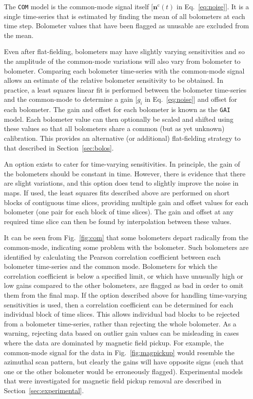 \documentclass[useAMS,usenatbib,nofootinbib]{mn2e}
\newcommand{\model}[1]{\texttt{#1}}
\begin{document}
The \model{COM} model is the common-mode signal itself
[$\mathbf{n}^\mathrm{c}(t)$ in Eq.~\ref{eq:noise}]. It is a single
time-series that is estimated by finding the mean of all bolometers at
each time step. Bolometer values that have been flagged as unusable
are excluded from the mean.

Even after flat-fielding, bolometers may have slightly varying
sensitivities and so the amplitude of the common-mode variations will
also vary from bolometer to bolometer. Comparing each bolometer
time-series with the common-mode signal allows an estimate of the
relative bolometer sensitivity to be obtained. In practice, a least
squares linear fit is performed between the bolometer time-series and
the common-mode to determine a gain [$g_i$ in Eq.~\ref{eq:noise}] and
offset for each bolometer.  The gain and offset for each bolometer is
known as the \model{GAI} model. Each bolometer value can then
optionally be scaled and shifted using these values so that all
bolometers share a common (but as yet unknown) calibration. This
provides an alternative (or additional) flat-fielding strategy to that
described in Section~\ref{sec:bolos}.

An option exists to cater for time-varying sensitivities. In
principle, the gain of the bolometers should be constant in
time. However, there is evidence that there are slight variations, and
this option does tend to slightly improve the noise in maps.  If used,
the least squares fits described above are performed on short blocks
of contiguous time slices, providing multiple gain and offset values
for each bolometer (one pair for each block of time slices). The gain
and offset at any required time slice can then be found by
interpolation between these values.

It can be seen from Fig.~\ref{fig:com} that some bolometers depart
radically from the common-mode, indicating some problem with the
bolometer. Such bolometers are identified by calculating the Pearson
correlation coefficient between each bolometer time-series and the
common mode. Bolometers for which the correlation coefficient is below
a specified limit, or which have unusually high or low gains compared
to the other bolometers, are flagged as bad in order to omit them from
the final map. If the option described above for handling time-varying
sensitivities is used, then a correlation coefficient can be
determined for each individual block of time slices.  This allows
individual bad blocks to be rejected from a bolometer time-series,
rather than rejecting the whole bolometer. As a warning, rejecting
data based on outlier gain values can be misleading in cases where the
data are dominated by magnetic field pickup. For example, the
common-mode signal for the data in Fig.~\ref{fig:magpickup} would
resemble the azimuthal scan pattern, but clearly the gains will have
opposite signs (such that one or the other bolometer would be
erroneously flagged). Experimental models that were investigated for
magnetic field pickup removal are described in
Section~\ref{sec:experimental}.
\end{document}
